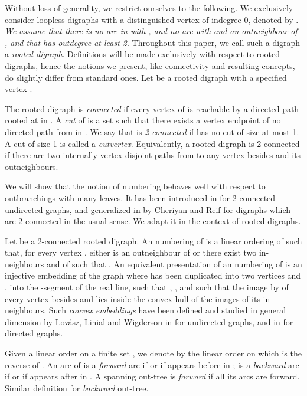 \documentclass{article}
\begin{document}
Without loss of generality, we restrict ourselves to the following. We exclusively consider loopless digraphs with a distinguished vertex of indegree 0, denoted by . \emph{We assume that there is no arc  in  with , and no arc  with  and  an outneighbour of , and that  has outdegree at least 2}. Throughout this paper, we call such a digraph a \emph{rooted digraph}. Definitions will be made exclusively with respect to rooted digraphs, hence the notions we present, like connectivity and resulting concepts, do slightly differ from standard ones.
Let  be a rooted digraph with a specified vertex . 

The rooted digraph  is \emph{connected} if every vertex of  is reachable by a directed path rooted at  in . A \emph{cut} of  is a set  such that there exists a vertex  endpoint of no directed path from  in . We say that  is \emph{2-connected} if  has no cut of size at most 1. A cut of size 1 is called a \emph{cutvertex}. Equivalently, a rooted digraph is 2-connected if there are two internally vertex-disjoint paths from  to any vertex besides  and its outneighbours.

We will show that the notion of  numbering behaves well with respect to outbranchings with many leaves. It has been introduced in \cite{stnum} for 2-connected undirected graphs, and generalized in \cite{stnumdir} by Cheriyan and Reif for digraphs which are 2-connected in the usual sense. We adapt it in the context of rooted digraphs.

Let  be a 2-connected rooted digraph. An  numbering of  is a linear ordering  of  such that, for every vertex , either  is an outneighbour of  
or there exist two in-neighbours  and  of  such that . An equivalent presentation of an  numbering of  is an injective embedding  of the graph  where  has been duplicated into two vertices  and , into the -segment of the real line, such that , , and such that the image by  of every vertex besides  and  lies inside the convex hull of the images of its in-neighbours. Such \emph{convex embeddings} have been defined and studied in general dimension by Lov\'asz, Linial and Wigderson in \cite{LLWemb} for undirected graphs, and in \cite{stnumdir} for directed graphs.

Given a linear order  on a finite set , we denote by  the linear order on  which is the reverse of . An arc  of  is a \emph{forward} arc
if  or if  appears before  in ;  is a \emph{backward} arc if  or if  appears after  in . A spanning out-tree  is \emph{forward} if all its arcs are forward. Similar
definition for \emph{backward} out-tree.
\end{document}
